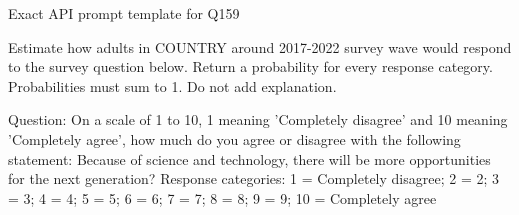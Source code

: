 \begin{promptlisting}{Exact API prompt template for Q159}

Estimate how adults in {{COUNTRY}} around 2017-2022 survey wave would respond to the survey question below.
Return a probability for every response category. Probabilities must sum to 1. Do not add explanation.

Question: On a scale of 1 to 10, 1 meaning 'Completely disagree' and 10 meaning 'Completely agree', how much do you agree or disagree with the following statement: Because of science and technology, there will be more opportunities for the next generation?
Response categories: 1 = Completely disagree; 2 = 2; 3 = 3; 4 = 4; 5 = 5; 6 = 6; 7 = 7; 8 = 8; 9 = 9; 10 = Completely agree

\end{promptlisting}
